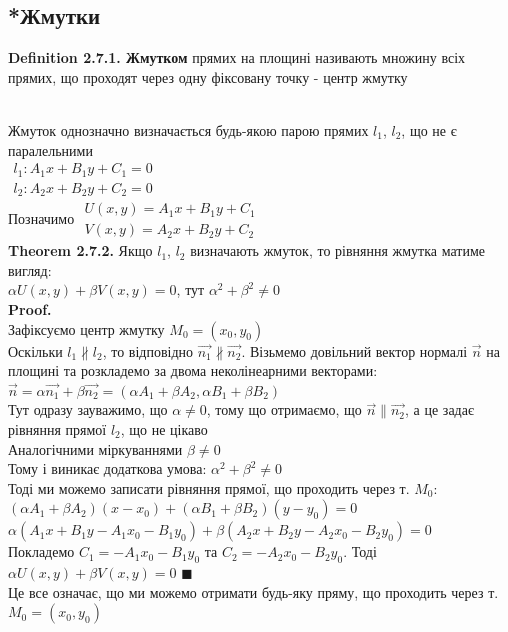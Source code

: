 \documentclass[a4paper, 10pt]{extarticle}
\def\defin#1{\textbf{Definition {#1}}}
\def\th#1{\textbf{Theorem {#1}}}
\def\proof{\textbf{Proof.}\\}
\def\bigline{\vspace{5mm}\\}
\def\qed{$\blacksquare$}
\def\qed{$\blacksquare$}
\theoremstyle{theoremdd}
\theoremstyle{theoremdd}
\theoremstyle{theoremdd}
\theoremstyle{theoremdd}
\theoremstyle{theoremdd}
\theoremstyle{theoremdd}
\theoremstyle{theoremdd}
\theoremstyle{theoremdd}
\begin{document}
\subsection{*Жмутки}
\defin{2.7.1. Жмутком} прямих на площині називають множину всіх прямих, що проходят через одну фіксовану точку - центр жмутку\\
\\
Жмуток однозначно визначається будь-якою парою прямих $l_1$, $l_2$, що не є паралельними\\
$\begin{gathered}
l_1: A_1x+B_1y+C_1 = 0\\
l_2: A_2x + B_2y+C_2 = 0
\end{gathered}
$\\
Позначимо $\begin{gathered}
U(x,y) = A_1x+B_1y+C_1\\
V(x,y) = A_2x + B_2y+C_2
\end{gathered}$\\
\th{2.7.2.} Якщо $l_1$, $l_2$ визначають жмуток, то рівняння жмутка матиме вигляд:\\
$\alpha U(x,y) + \beta V(x,y) = 0$, тут $\alpha^2 + \beta^2 \neq 0$\\
\proof
Зафіксуємо центр жмутку $M_0 = (x_0,y_0)$\\
Оскільки $l_1 \not\parallel l_2$, то відповідно $\vec{n_1} \not\parallel \vec{n_2}$. Візьмемо довільний вектор нормалі $\vec{n}$ на площині та розкладемо за двома неколінеарними векторами:\\
$\vec{n} = \alpha \vec{n_1} + \beta \vec{n_2} = (\alpha A_1 + \beta A_2, \alpha B_1+\beta B_2)$\\
Тут одразу зауважимо, що $\alpha \neq 0$, тому що отримаємо, що $\vec{n} \parallel \vec{n_2}$, а це задає рівняння прямої $l_2$, що не цікаво\\
Аналогічними міркуваннями $\beta \neq 0$\\
Тому і виникає додаткова умова: $\alpha^2 + \beta^2 \neq 0$\\
Тоді ми можемо записати рівняння прямої, що проходить через т. $M_0$:\\
$(\alpha A_1 + \beta A_2)(x-x_0) + (\alpha B_1 + \beta B_2)(y-y_0) = 0$\\
$\alpha(A_1x+B_1y-A_1x_0-B_1y_0) + \beta(A_2x+B_2y-A_2x_0-B_2y_0) = 0$\\
Покладемо $C_1 = -A_1x_0 -B_1y_0$ та $C_2 = -A_2x_0-B_2y_0$. Тоді\\
$\alpha U(x,y) + \beta V(x,y) = 0$ \qed
\bigline
Це все означає, що ми можемо отримати будь-яку пряму, що проходить через т. $M_0 =(x_0,y_0)$
\fi
\newpage
\end{document}
